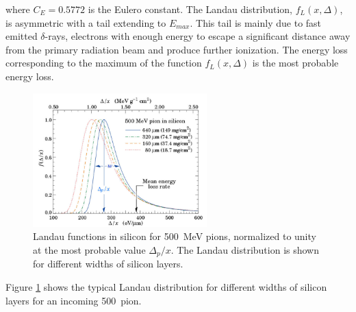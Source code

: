 where $C_E=0.5772$ is the Eulero constant.
The Landau distribution, $f_L(x,\Delta)$, is asymmetric with a tail extending to $E_{max}$. This tail is mainly due to fast emitted $\delta$-rays, electrons with enough energy to escape a significant distance away from the primary radiation beam and produce further ionization. The energy loss corresponding to the maximum of the function $f_L(x,\Delta)$ is the most probable energy loss.
\begin{figure}
\center
\includegraphics[width=0.6\textwidth,height=0.45\textwidth]{Images/tracking_det/Landau.jpg}
\caption{Landau functions in silicon for 500~MeV pions, normalized to unity at the most probable value $\Delta_p/x$. The Landau distribution is shown for different widths of silicon layers.}
\label{pic:landau}
\end{figure}
Figure \ref{pic:landau} shows the typical Landau distribution for different widths of silicon layers for an incoming 500~\MeV pion.
